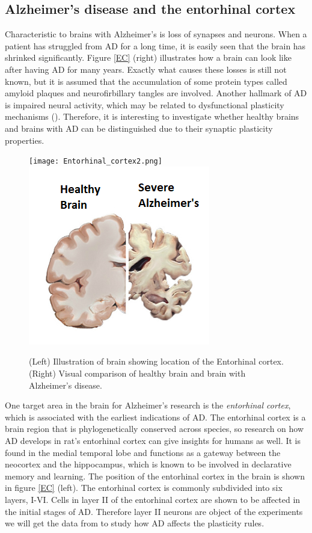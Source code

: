 \subsection{Alzheimer's disease and the entorhinal cortex}
\label{EandA}

Characteristic to brains with Alzheimer's is loss of synapses and neurons. When a patient has struggled from AD for a long time, it is easily seen that the brain has shrinked significantly. Figure \ref{EC} (right) illustrates how a brain can look like after having AD for many years. Exactly what causes these losses is still not known, but it is assumed that the accumulation of some protein types called amyloid plaques and neurofirbillary tangles are involved. Another hallmark of AD is impaired neural activity, which may be related to dysfunctional plasticity mechanisms (\cite{Zott}). Therefore, it is interesting to investigate whether healthy brains and brains with AD can be distinguished due to their synaptic plasticity properties.

\begin{figure}[h]
    \caption{(Left) Illustration of brain showing location of the Entorhinal cortex. (Right) Visual comparison of healthy brain and brain with Alzheimer's disease.}
    \label{EC}
    \centering
    \texttt{[image: Entorhinal\_cortex2.png]}
    \includegraphics[scale=0.8]{fig/Alzheimers_picture.png}    
    \label{brain}
\end{figure} 

One target area in the brain for Alzheimer's research is the \textit{entorhinal cortex}, which is associated with the earliest indications of AD. The entorhinal cortex is a brain region that is phylogenetically conserved across species, so research on how AD develops in rat's entorhinal cortex can give insights for humans as well. It is found in the medial temporal lobe and functions as a gateway between the neocortex and the hippocampus, which is known to be involved in declarative memory and learning. The position  of the entorhinal cortex in the brain is shown in figure \ref{EC} (left). The entorhinal cortex is commonly subdivided into six layers, I-VI. Cells in layer II of the entorhinal cortex are shown to be affected in the initial stages of AD. Therefore layer II neurons are object of the experiments we will get the data from to study how AD affects the plasticity rules.




